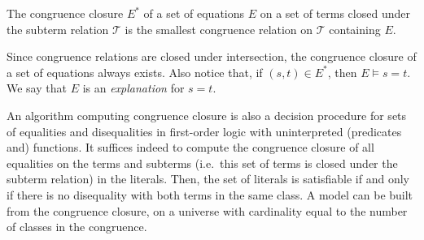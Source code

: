 \documentclass[smallextended]{svjour3}
\begin{document}
\begin{definition}
The congruence closure $E^*$ of a set of equations $E$ on a set of terms closed under the subterm relation $\mathcal{T}$ is the smallest congruence relation on $\mathcal{T}$ containing $E$.

\end{definition}
\noindent
Since congruence relations are closed under intersection, the congruence closure of a set of equations always exists.  Also notice that, if  $(s,t) \in E^*$, then $E \models s = t$.  We say that $E$ is an \emph{explanation} for $s = t$.

An algorithm computing congruence closure is also a decision procedure for sets of equalities and disequalities in first-order logic with uninterpreted (predicates and) functions.  It suffices indeed to compute the congruence closure of all equalities on the terms and subterms (i.e.\ this set of terms is closed under the subterm relation) in the literals.  Then, the set of literals is satisfiable if and only if there is no disequality with both terms in the same class.  A model can be built from the congruence closure, on a universe with cardinality equal to the number of classes in the congruence.

%
%
%
%
%
\end{document}
